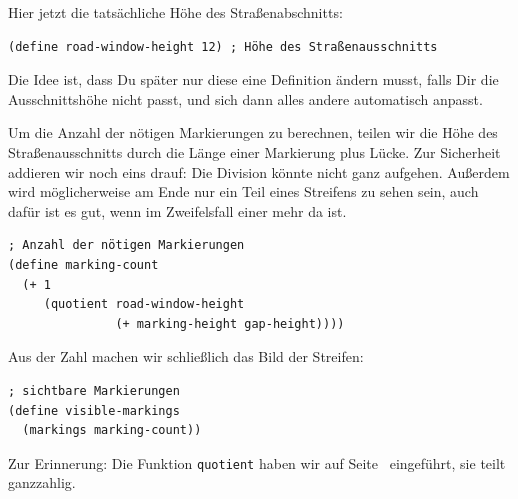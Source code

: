 %
Hier jetzt die tatsächliche Höhe des Straßenabschnitts:
%
\begin{lstlisting}
(define road-window-height 12) ; Höhe des Straßenausschnitts
\end{lstlisting}
%
Die Idee ist, dass Du später nur diese eine Definition ändern musst, falls
Dir die Ausschnittshöhe nicht passt, und sich dann alles andere
automatisch anpasst.

Um die Anzahl der nötigen Markierungen zu berechnen, teilen wir die
Höhe des Straßenausschnitts durch die Länge einer Markierung plus
Lücke.  Zur Sicherheit addieren wir noch eins drauf: Die Division könnte
nicht ganz aufgehen.  Außerdem wird möglicherweise am Ende nur ein
Teil eines Streifens zu sehen sein, auch dafür ist es gut, wenn im
Zweifelsfall einer mehr da ist.
%
\begin{lstlisting}
; Anzahl der nötigen Markierungen
(define marking-count
  (+ 1
     (quotient road-window-height
               (+ marking-height gap-height))))
\end{lstlisting}
%
Aus der Zahl machen wir schließlich
das Bild der Streifen:
%
\begin{lstlisting}
; sichtbare Markierungen
(define visible-markings
  (markings marking-count))
\end{lstlisting}
%
Zur Erinnerung: Die Funktion \lstinline{quotient} haben wir auf
Seite~\pageref{func:quotient} eingeführt, sie teilt ganzzahlig.

